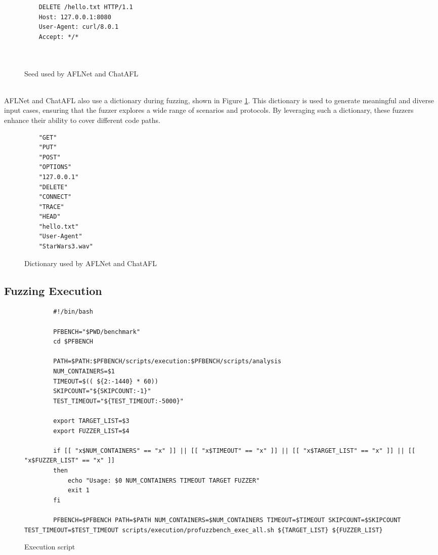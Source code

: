 \begin{figure}[H]
    \centering
    \begin{adjustbox}{valign=t}
    \begin{lstlisting}
    DELETE /hello.txt HTTP/1.1
    Host: 127.0.0.1:8080
    User-Agent: curl/8.0.1
    Accept: */*

    
    \end{lstlisting}
    \end{adjustbox}
    \caption{Seed used by AFLNet and ChatAFL}
\end{figure}
\phantom{}\\
AFLNet and ChatAFL also use a dictionary during fuzzing, shown in Figure \ref{fig:dictionary}. This dictionary is used to generate meaningful and diverse input cases, ensuring that the fuzzer explores a wide range of scenarios and protocols. By leveraging such a dictionary, these fuzzers enhance their ability to cover different code paths.
\begin{figure}[H]
    \centering
    \begin{adjustbox}{valign=t}
    \begin{lstlisting}
    "GET"
    "PUT"
    "POST"
    "OPTIONS"
    "127.0.0.1"
    "DELETE"
    "CONNECT"
    "TRACE"
    "HEAD"
    "hello.txt"
    "User-Agent"
    "StarWars3.wav"
    \end{lstlisting}
    \end{adjustbox}
    \caption{Dictionary used by AFLNet and ChatAFL}
    \label{fig:dictionary}
\end{figure}

\subsection{Fuzzing Execution}

\begin{figure}[H]
    \begin{lstlisting}
        #!/bin/bash

        PFBENCH="$PWD/benchmark"
        cd $PFBENCH

        PATH=$PATH:$PFBENCH/scripts/execution:$PFBENCH/scripts/analysis
        NUM_CONTAINERS=$1
        TIMEOUT=$(( ${2:-1440} * 60))
        SKIPCOUNT="${SKIPCOUNT:-1}"
        TEST_TIMEOUT="${TEST_TIMEOUT:-5000}"

        export TARGET_LIST=$3
        export FUZZER_LIST=$4

        if [[ "x$NUM_CONTAINERS" == "x" ]] || [[ "x$TIMEOUT" == "x" ]] || [[ "x$TARGET_LIST" == "x" ]] || [[ "x$FUZZER_LIST" == "x" ]]
        then
            echo "Usage: $0 NUM_CONTAINERS TIMEOUT TARGET FUZZER"
            exit 1
        fi

        PFBENCH=$PFBENCH PATH=$PATH NUM_CONTAINERS=$NUM_CONTAINERS TIMEOUT=$TIMEOUT SKIPCOUNT=$SKIPCOUNT TEST_TIMEOUT=$TEST_TIMEOUT scripts/execution/profuzzbench_exec_all.sh ${TARGET_LIST} ${FUZZER_LIST}
    \end{lstlisting}
    \caption{Execution script}
    \label{fig:exec_script_aflnetchatafl}
\end{figure}

